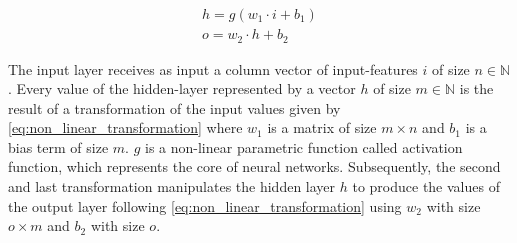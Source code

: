 \begin{equation}\label{eq:non_linear_transformation}
\begin{gathered}
h = g(w_1 \cdot i + b_1) \\
o = w_2 \cdot h + b_2
\end{gathered}
\end{equation}

The input layer receives as input a column vector of input-features $i$ of size $n \in \mathbb{N}$. Every value of the hidden-layer represented by a vector $h$ of size $m \in \mathbb{N}$ is the result of a transformation of the input values given by \vref{eq:non_linear_transformation} where $w_1$ is a matrix of size $m \times n$ and $b_1$ is a bias term of size $m$. $g$ is a non-linear parametric function called activation function, which represents the core of neural networks. Subsequently, the second and last transformation manipulates the hidden layer $h$ to produce the values of the output layer following \vref{eq:non_linear_transformation} using $w_2$ with size $o \times m$ and $b_2$ with size $o$.  

